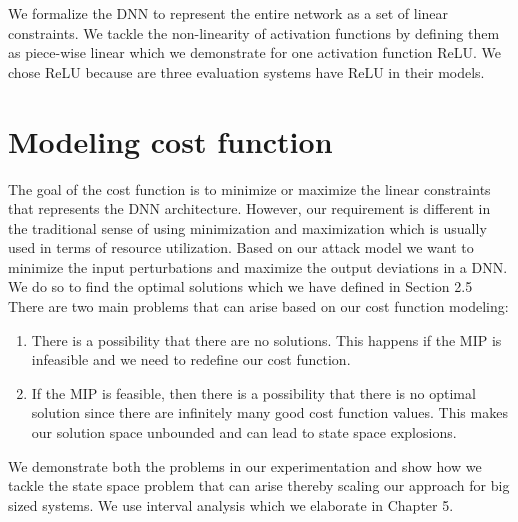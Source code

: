 We formalize the \ac{DNN} to represent the entire network as a set of linear constraints. 
We tackle the non-linearity of activation functions by defining them as piece-wise linear which we demonstrate for one activation function ReLU.
We chose ReLU because are three evaluation systems have ReLU in their models. 

\section{Modeling cost function}
The goal of the cost function is to minimize or maximize the linear constraints that represents the \ac{DNN} architecture. 
However, our requirement is different in the traditional sense of using minimization and maximization which is usually used in terms of resource utilization. 
Based on our attack model we want to minimize the input perturbations and maximize the output deviations in a \ac{DNN}.
We do so to find the optimal solutions which we have defined in Section 2.5
There are two main problems that can arise based on our cost function modeling:
\begin{enumerate}
	\item There is a possibility that there are no solutions. 
	This happens if the \ac{MIP} is infeasible and we need to redefine our cost function. 
	\item If the \ac{MIP} is feasible, then there is a possibility that there is no optimal solution since there are infinitely many good cost function values. 
	This makes our solution space unbounded and can lead to state space explosions. 
\end{enumerate}

We demonstrate both the problems in our experimentation and show how we tackle the state space problem that can arise thereby scaling our approach for big sized systems. 
We use interval analysis which we elaborate in Chapter 5.


















